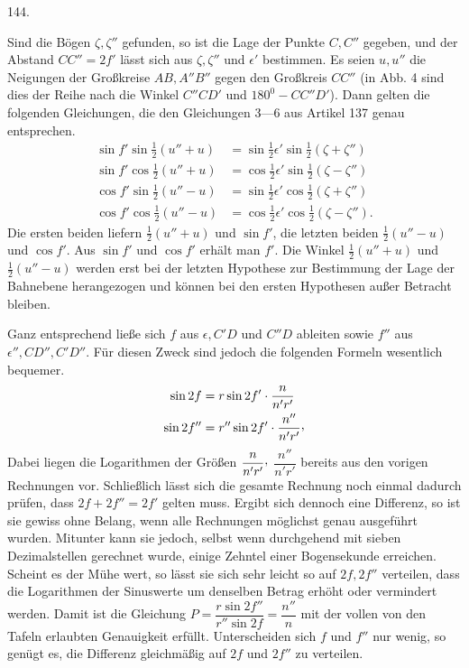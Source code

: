 \par{}\medskip
{}\begin{center}\hypertarget{native-195-article144}{}144.\end{center}
Sind die Bögen $\zeta,\zeta''$ gefunden, so ist die Lage der Punkte $C,C''$ gegeben, und der Abstand $CC''=2f'$ lässt sich aus $\zeta,\zeta''$ und $\epsilon'$ bestimmen. Es seien $u,u''$ die Neigungen der Großkreise $AB,A''B''$ gegen den Großkreis $CC''$ (in Abb. 4 sind dies der Reihe nach die Winkel $C''CD'$ und $180^{0}-CC''D'$). Dann gelten die folgenden Gleichungen, die den Gleichungen 3—6 aus Artikel 137 genau entsprechen.
\[
\begin{aligned}
\sin f'\sin\tfrac12(u''+u)&=\sin\tfrac12\epsilon'\sin\tfrac12(\zeta+\zeta'')\\
\sin f'\cos\tfrac12(u''+u)&=\cos\tfrac12\epsilon'\sin\tfrac12(\zeta-\zeta'')\\
\cos f'\sin\tfrac12(u''-u)&=\sin\tfrac12\epsilon'\cos\tfrac12(\zeta+\zeta'')\\
\cos f'\cos\tfrac12(u''-u)&=\cos\tfrac12\epsilon'\cos\tfrac12(\zeta-\zeta'').
\end{aligned}
\]
Die ersten beiden liefern $\tfrac12(u''+u)$ und $\sin f'$, die letzten beiden $\tfrac12(u''-u)$ und $\cos f'$. Aus $\sin f'$ und $\cos f'$ erhält man $f'$. Die Winkel $\tfrac12(u''+u)$ und $\tfrac12(u''-u)$ werden erst bei der letzten Hypothese zur Bestimmung der Lage der Bahnebene herangezogen und können bei den ersten Hypothesen außer Betracht bleiben.

Ganz entsprechend ließe sich $f$ aus $\epsilon,C'D$ und $C''D$ ableiten sowie $f''$ aus $\epsilon'',CD'',C'D''$. Für diesen Zweck sind jedoch die folgenden Formeln wesentlich bequemer.
\[
\begin{aligned}
\sin2f&=r\sin2f'\cdot\frac{n}{n'r'}\\
\sin2f''&=r''\sin2f'\cdot\frac{n''}{n'r'}\mathpunct{\raisebox{.45ex}{,}}
\end{aligned}
\]
Dabei liegen die Logarithmen der Größen $\dfrac{n}{n'r'}\mathpunct{\raisebox{.45ex}{,}}$ $\dfrac{n''}{n'r'}$ bereits aus den vorigen Rechnungen vor. Schließlich lässt sich die gesamte Rechnung noch einmal dadurch prüfen, dass $2f+2f''=2f'$ gelten muss. Ergibt sich dennoch eine Differenz, so ist sie gewiss ohne Belang, wenn alle Rechnungen möglichst genau ausgeführt wurden. Mitunter kann sie jedoch, selbst wenn durchgehend mit sieben Dezimalstellen gerechnet wurde, einige Zehntel einer Bogensekunde erreichen. Scheint es der Mühe wert, so lässt sie sich sehr leicht so auf $2f,2f''$ verteilen, dass die Logarithmen der Sinuswerte um denselben Betrag erhöht oder vermindert werden. Damit ist die Gleichung $P=\dfrac{r\sin2f''}{r''\sin2f}=\dfrac{n''}{n}$ mit der vollen von den Tafeln erlaubten Genauigkeit erfüllt. Unterscheiden sich $f$ und $f''$ nur wenig, so genügt es, die Differenz gleichmäßig auf $2f$ und $2f''$ zu verteilen.
